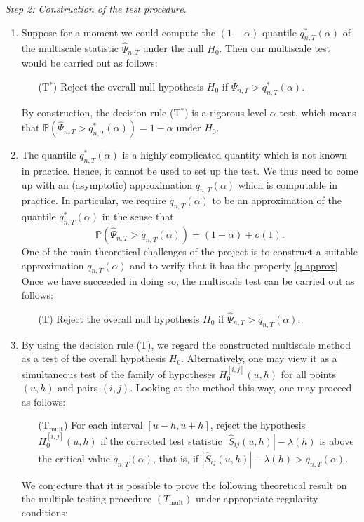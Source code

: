 \documentclass[a4paper,12pt]{article}
\begin{document}
\noindent \textit{Step 2: Construction of the test procedure.}
\begin{enumerate}[label=(\roman*),leftmargin=0.75cm]

\item Suppose for a moment we could compute the $(1-\alpha)$-quantile $q_{n,T}^*(\alpha)$ of the multiscale statistic $\hat{\Psi}_{n,T}$ under the null $H_0$. Then our multiscale test would be carried out as follows: 
\begin{itemize}[leftmargin=1cm]

\item[(T$^*$)] Reject the overall null hypothesis $H_0$ if $\hat{\Psi}_{n,T} > q_{n,T}^*(\alpha)$. 
\end{itemize}
By construction, the decision rule (T$^*$) is a rigorous level-$\alpha$-test, which means that $\mathbb{P}(\hat{\Psi}_{n,T} > q_{n,T}^*(\alpha)) = 1-\alpha$ under $H_0$. 
\item The quantile $q_{n,T}^*(\alpha)$ is a highly complicated quantity which is not known in practice. Hence, it cannot be used to set up the test. We thus need to come up with an (asymptotic) approximation $q_{n,T}(\alpha)$ which is computable in practice. In particular, we require $q_{n,T}(\alpha)$ to be an approximation of the quantile $q_{n,T}^*(\alpha)$ in the sense that 
\begin{equation}\label{q-approx}
\mathbb{P} (\hat{\Psi}_{n,T} > q_{n,T}(\alpha)) = (1-\alpha) + o(1). 
\end{equation}
One of the main theoretical challenges of the project is to construct a suitable approximation $q_{n,T}(\alpha)$ and to verify that it has the property \eqref{q-approx}. Once we have succeeded in doing so, the multiscale test can be carried out as follows: 
\begin{itemize}[leftmargin=0.8cm]
\item[(T)] Reject the overall null hypothesis $H_0$ if $\hat{\Psi}_{n,T} > q_{n,T}(\alpha)$. 
\end{itemize}

\item By using the decision rule (T), we regard the constructed multiscale method as a test of the overall hypothesis $H_0$. Alternatively, one may view it as a simultaneous test of the family of hypotheses $H_0^{[i,j]}(u,h)$ for all points $(u,h)$ and pairs $(i,j)$. Looking at the method this way, one may proceed as follows: 
\begin{itemize}[leftmargin=1.5cm]
\item[(T$_\text{mult}$)] 
For each interval $[u-h,u+h]$, reject the hypothesis $H_0^{[i,j]}(u,h)$ if the corrected test statistic $|\hat{S}_{ij}(u,h)| - \lambda(h)$ is above the critical value $q_{n,T}(\alpha)$, that is, if $|\hat{S}_{ij}(u,h)| - \lambda(h) > q_{n,T}(\alpha)$. 
\end{itemize}
We conjecture that it is possible to prove the following theoretical result on the multiple testing procedure $(T_{\text{mult}})$ under appropriate regularity conditions: 


\end{enumerate}
\end{document}
